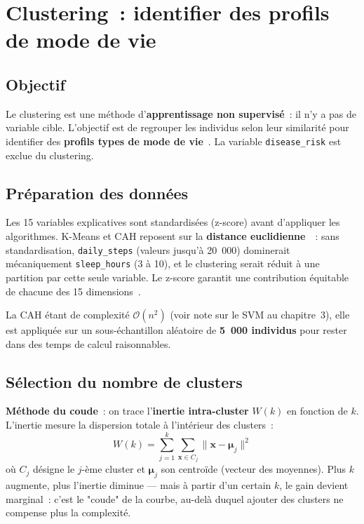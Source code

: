 
\section{Clustering~: identifier des profils de mode de vie}

\subsection{Objectif}

Le clustering est une méthode d'\textbf{apprentissage non supervisé}~: il n'y a pas de variable cible. L'objectif est de regrouper les individus selon leur similarité pour identifier des \textbf{profils types de mode de vie}~\cite{macqueen1967}. La variable \texttt{disease\_risk} est exclue du clustering.

\subsection{Préparation des données}

Les 15 variables explicatives sont standardisées (z-score) avant d'appliquer les algorithmes. K-Means et CAH reposent sur la \textbf{distance euclidienne}~\cite{macqueen1967}~: sans standardisation, \texttt{daily\_steps} (valeurs jusqu'à 20~000) dominerait mécaniquement \texttt{sleep\_hours} (3 à 10), et le clustering serait réduit à une partition par cette seule variable. Le z-score garantit une contribution équitable de chacune des 15 dimensions~\cite{hastie2009}.

La CAH étant de complexité $\mathcal{O}(n^2)$ (voir note sur le SVM au chapitre~3), elle est appliquée sur un sous-échantillon aléatoire de \textbf{5~000 individus} pour rester dans des temps de calcul raisonnables.

\subsection{Sélection du nombre de clusters}

\textbf{Méthode du coude}~: on trace l'\textbf{inertie intra-cluster} $W(k)$ en fonction de $k$. L'inertie mesure la dispersion totale à l'intérieur des clusters~:
\begin{equation}
W(k) = \sum_{j=1}^{k}\sum_{\mathbf{x} \in C_j}\|\mathbf{x} - \boldsymbol{\mu}_j\|^2
\end{equation}
où $C_j$ désigne le $j$-ème cluster et $\boldsymbol{\mu}_j$ son centroïde (vecteur des moyennes). Plus $k$ augmente, plus l'inertie diminue --- mais à partir d'un certain $k$, le gain devient marginal~: c'est le "coude" de la courbe, au-delà duquel ajouter des clusters ne compense plus la complexité.


